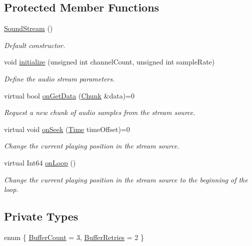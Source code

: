 \subsection*{Protected Member Functions}
\begin{DoxyCompactItemize}
\item 
\mbox{\hyperlink{classsf_1_1_sound_stream_a769d08f4c3c6b4340ef3a838329d2e5c}{Sound\+Stream}} ()
\begin{DoxyCompactList}\small\item\em Default constructor. \end{DoxyCompactList}\item 
void \mbox{\hyperlink{classsf_1_1_sound_stream_a9c351711198ee1aa77c2fefd3ced4d2c}{initialize}} (unsigned int channel\+Count, unsigned int sample\+Rate)
\begin{DoxyCompactList}\small\item\em Define the audio stream parameters. \end{DoxyCompactList}\item 
virtual bool \mbox{\hyperlink{classsf_1_1_sound_stream_a968ec024a6e45490962c8a1121cb7c5f}{on\+Get\+Data}} (\mbox{\hyperlink{structsf_1_1_sound_stream_1_1_chunk}{Chunk}} \&data)=0
\begin{DoxyCompactList}\small\item\em Request a new chunk of audio samples from the stream source. \end{DoxyCompactList}\item 
virtual void \mbox{\hyperlink{classsf_1_1_sound_stream_a907036dd2ca7d3af5ead316e54b75997}{on\+Seek}} (\mbox{\hyperlink{classsf_1_1_time}{Time}} time\+Offset)=0
\begin{DoxyCompactList}\small\item\em Change the current playing position in the stream source. \end{DoxyCompactList}\item 
virtual Int64 \mbox{\hyperlink{classsf_1_1_sound_stream_a3f717d18846f261fc375d71d6c7e41da}{on\+Loop}} ()
\begin{DoxyCompactList}\small\item\em Change the current playing position in the stream source to the beginning of the loop. \end{DoxyCompactList}\end{DoxyCompactItemize}
\subsection*{Private Types}
\begin{DoxyCompactItemize}
\item 
enum \{ \mbox{\hyperlink{classsf_1_1_sound_stream_a2419ce94e45f7d4d0302b7963282c40ca3adf3b6cd18edb6121fda81e569dbbf5}{Buffer\+Count}} = 3, 
\mbox{\hyperlink{classsf_1_1_sound_stream_a2419ce94e45f7d4d0302b7963282c40ca44b14ec3fd6194cf72c8fecef516f98b}{Buffer\+Retries}} = 2
 \}
\end{DoxyCompactItemize}
